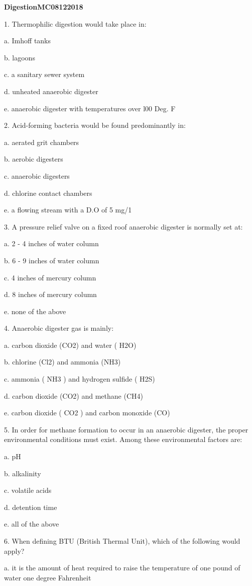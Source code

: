 \documentclass{article}
\begin{document}
\textbf{DigestionMC08122018}

1. Thermophilic digestion would take place in: 

a. Imhoff tanks 

b. lagoons 

c. a sanitary sewer system 

d. unheated anaerobic digester 

e. anaerobic digester with temperatures over l00 Deg. F 


2. Acid-forming bacteria would be found predominantly in: 

a. aerated grit chambers 

b. aerobic digesters 

c. anaerobic digesters 

d. chlorine contact chambers 

e. a flowing stream with a D.O of 5 mg/1 


3. A pressure relief valve on a fixed roof anaerobic digester is normally set at: 

a. 2 - 4 inches of water column 

b. 6 - 9 inches of water column 

c. 4 inches of mercury column 

d. 8 inches of mercury column 

e. none of the above 


4. Anaerobic digester gas is mainly: 

a. carbon dioxide (CO2) and water ( H2O) 

b. chlorine (Cl2) and ammonia (NH3) 

c. ammonia ( NH3 ) and hydrogen sulfide ( H2S) 

d. carbon dioxide (CO2) and methane (CH4) 

e. carbon dioxide ( CO2 ) and carbon monoxide (CO) 


5. In order for methane formation to occur in an anaerobic digester, the proper environmental conditions must exist.  Among these environmental factors are: 

a. pH 

b. alkalinity 

c. volatile acids 

d. detention time 

e. all of the above 


6. When defining BTU (British Thermal Unit), which of the following would apply? 

a. it is the amount of heat required to raise the temperature of one pound of water one degree Fahrenheit 
\end{document}
